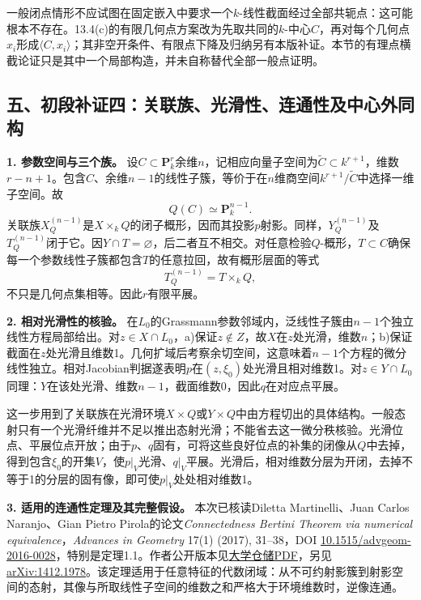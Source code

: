\documentclass[UTF8,a4paper]{ctexbook}
\begin{document}
一般闭点情形不应试图在固定嵌入中要求一个$k$-线性截面经过全部共轭点：这可能根本不存在。13.4(c)的有限几何点方案改为先取共同的$k$-中心$C$，再对每个几何点$x_i$形成$\langle C,x_i\rangle$；其非空开条件、有限点下降及归纳另有本版补证。本节的有理点横截论证只是其中一个局部构造，并未自称替代全部一般点证明。

\subsection*{五、初段补证四：关联族、光滑性、连通性及中心外同构}

\noindent\textbf{1. 参数空间与三个族。}
设$C\subset\mathbf P^r_k$余维$n$，记相应向量子空间为$\widetilde C\subset k^{r+1}$，维数$r-n+1$。包含$C$、余维$n-1$的线性子簇，等价于在$n$维商空间$k^{r+1}/\widetilde C$中选择一维子空间。故
\[
Q(C)\simeq\mathbf P^{n-1}_k.
\]
关联族$X_Q^{(n-1)}$是$X\times_k Q$的闭子概形，因而其投影$p$射影。同样，$Y_Q^{(n-1)}$及$T_Q^{(n-1)}$闭于它。因$Y\cap T=\varnothing$，后二者互不相交。对任意检验$Q$-概形，$T\subset C$确保每一个参数线性子簇都包含$T$的任意拉回，故有概形层面的等式
\[
T_Q^{(n-1)}=T\times_k Q,
\]
不只是几何点集相等。因此$r$有限平展。

\noindent\textbf{2. 相对光滑性的核验。}
在$L_0$的Grassmann参数邻域内，泛线性子簇由$n-1$个独立线性方程局部给出。对$z\in X\cap L_0$，a)保证$z\notin Z$，故$X$在$z$处光滑，维数$n$；b)保证截面在$z$处光滑且维数1。几何扩域后考察余切空间，这意味着$n-1$个方程的微分线性独立。相对Jacobian判据遂表明$p$在$(z,\xi_0)$处光滑且相对维数1。对$z\in Y\cap L_0$同理：$Y$在该处光滑、维数$n-1$，截面维数0，因此$q$在对应点平展。

这一步用到了关联族在光滑环境$X\times Q$或$Y\times Q$中由方程切出的具体结构。一般态射只有一个光滑纤维并不足以推出态射光滑；不能省去这一微分秩核验。光滑位点、平展位点开放；由于$p$、$q$固有，可将这些良好位点的补集的闭像从$Q$中去掉，得到包含$\xi_0$的开集$V$，使$p|_V$光滑、$q|_V$平展。光滑后，相对维数分层为开闭，去掉不等于1的分层的固有像，即可使$p|_V$处处相对维数1。

\noindent\textbf{3. 适用的连通性定理及其完整假设。}
本次已核读Diletta Martinelli、Juan Carlos Naranjo、Gian Pietro Pirola的论文\emph{Connectedness Bertini Theorem via numerical equivalence}，\emph{Advances in Geometry} 17(1) (2017), 31--38，DOI \href{https://doi.org/10.1515/advgeom-2016-0028}{10.1515/advgeom-2016-0028}，特别是定理1.1。作者公开版本见\href{https://diposit.ub.edu/server/api/core/bitstreams/d9e33fe8-dd1c-42a4-a579-a349a203ca25/content}{大学仓储PDF}，另见\href{https://arxiv.org/abs/1412.1978}{arXiv:1412.1978}。该定理适用于任意特征的代数闭域：从不可约射影簇到射影空间的态射，其像与所取线性子空间的维数之和严格大于环境维数时，逆像连通。
\end{document}
